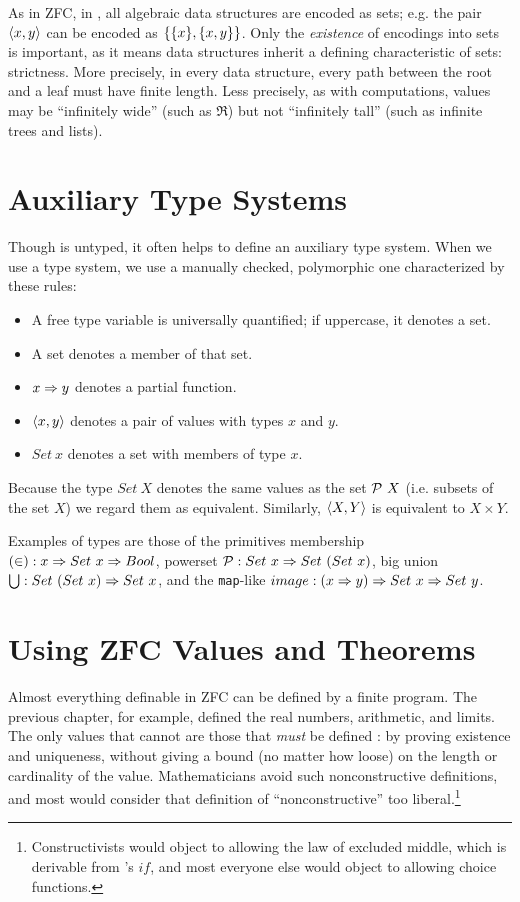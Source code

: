 As in ZFC, in \lzfclang, all algebraic data structures are encoded as sets; e.g. the pair $\langle{x,y}\rangle$ can be encoded as $\{{\{{x}\},\{{x,y}\}}\}$.
Only the \emph{existence} of encodings into sets is important, as it means data structures inherit a defining characteristic of sets: strictness.
More precisely, in every data structure, every path between the root and a leaf must have finite length.
Less precisely, as with computations, values may be ``infinitely wide'' (such as $\Re$) but not ``infinitely tall'' (such as infinite trees and lists).

\section{Auxiliary Type Systems}

Though \lzfclang is untyped, it often helps to define an auxiliary type system.
When we use a type system, we use a manually checked, polymorphic one characterized by these rules:
\begin{itemize}
	\item A free type variable is universally quantified; if uppercase, it denotes a set.
	\item A set denotes a member of that set.
	\item $x \Rightarrow y$ denotes a partial function.
	\item $\langle{x,y}\rangle$ denotes a pair of values with types $x$ and $y$.
	\item $Set~x$ denotes a set with members of type $x$.
\end{itemize}
Because the type $Set~X$ denotes the same values as the set $\mathcal{P}~X$ (i.e. subsets of the set $X$) we regard them as equivalent.
Similarly, $\langle{X,Y}\rangle$ is equivalent to $X \times Y$.

Examples of types are those of the \lzfclang primitives membership $(\in) : x \Rightarrow Set~x \Rightarrow Bool$, powerset $\mathcal{P} : Set~x \Rightarrow Set~(Set~x)$, big union $\textstyle\bigcup : Set~(Set~x) \Rightarrow Set~x$, and the \texttt{map}-like $image : (x \Rightarrow y) \Rightarrow Set~x \Rightarrow Set~y$.

\section{Using ZFC Values and Theorems}

Almost everything definable in ZFC can be defined by a finite \lzfclang program.
The previous chapter, for example, defined the real numbers, arithmetic, and limits.
The only values that cannot are those that \emph{must} be defined : by proving existence and uniqueness, without giving a bound (no matter how loose) on the length or cardinality of the value.
Mathematicians avoid such nonconstructive definitions, and most would consider that definition of ``nonconstructive'' too liberal.\footnote{Constructivists would object to allowing the law of excluded middle, which is derivable from \lzfclang's $if$, and most everyone else would object to allowing choice functions.}


